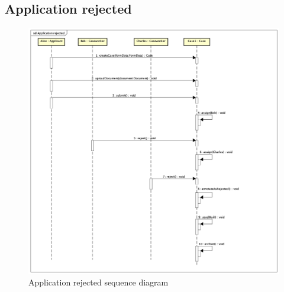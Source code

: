 \subsection{Application rejected}

\begin{figure}[htb!]
    \centering
    \includegraphics[width=\textwidth]{img/sd-application-rejected.png}
    \caption{Application rejected sequence diagram}
\end{figure}